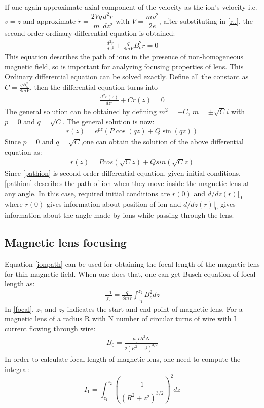 \documentclass[twocolumn,12pt]{article}
\numberwithin{equation}{section} %
\numberwithin{equation}{section}
\begin{document}
If one again approximate axial component of the velocity as the ion's velocity i.e. $v=\dot{z}$ and approximate $\ddot{r}=\dfrac{2Vq}{m}\dfrac{d^2r}{dz^2}$ with $V= \dfrac{mv^2}{2e}$, after substituting in \ref{r..}, the second order ordinary differential equation is obtained:
\begin{align}
    \frac{d^2r}{dz^2}+ \frac{q}{8mV} B_o^2r=0
    \label{ionpath}
\end{align}
This equation describes the path of ions in the presence of non-homogeneous magnetic field, so is important for analyzing focusing properties of lens. This Ordinary differential equation can be solved exactly. Define all the constant as $C=\frac{qB_o^2}{8mV}$, then the differential equation turns into 
\begin{align}
    \frac{d^2r(z)}{dz^2}+ Cr(z)=0
\end{align}
The general solution can be obtained by defining $m^2=-C$, $m=\pm \sqrt{C}i$ with $p=0$ and $q=\sqrt{C}$.
The general solution is now: 
\begin{align}
    r(z)=e^{pz}(P\cos(qz)+Q\sin(qz))
\end{align}
Since $p=0$ and $q=\sqrt{C}$,one can obtain the solution of the above differential equation as:
\begin{align}
    r(z)=Pcos(\sqrt{C}z)+Qsin(\sqrt{C}z)
    \label{pathion}
\end{align}
Since \ref{pathion} is second order differential equation, given initial conditions, \ref{pathion} describes the path of ion when they move inside the magnetic lens at any angle. In this case, required initial conditions are $r(0)$ and $d/dz(r)|_0$ where $r(0)$ gives information about position of ion and $d/dz(r)|_0$ gives information about the angle made by ions while passing through the lens. 

\subsection{Magnetic lens focusing}
Equation \ref{ionpath} can be used for obtaining the focal length of the magnetic lens for thin magnetic field. When one does that, one can get Busch equation\cite{Electrmic} of focal length as:
\begin{align}
    \frac{-1}{f_2}=\frac{q}{8mV} \int_{z_1}^{z_2}B_o^2dz
    \label{focal}
\end{align}
In \ref{focal}, $z_1$ and $z_2$ indicates the start and end point of magnetic lens. 
For a magnetic lens of a radius R with N number of circular turns of wire with I current flowing through wire:
\begin{align}
    B_0=\frac{\mu _o I R^2 N}{2(R^2+z^2)^{3/2}}
    \label{circwire}
\end{align}
In order to calculate focal length of magnetic lens, one need to compute the integral:
\begin{equation}
I_1=\int_{z_1}^{z_2} \left(\frac{1}{(R^2+z^2)^{3/2}}\right)^2dz
\end{equation}
\end{document}
